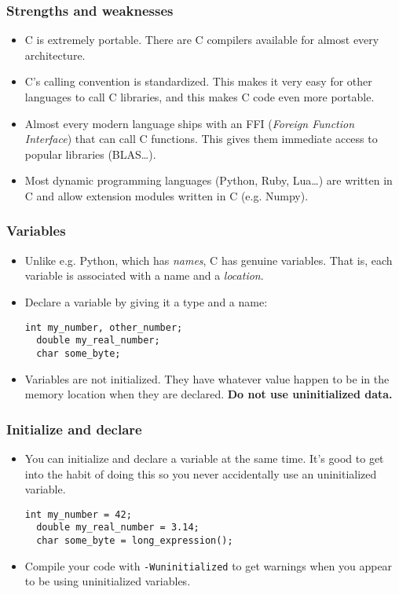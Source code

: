 \begin{frame}
  \frametitle{Strengths and weaknesses}
  \begin{itemize}
  \item C is extremely portable. There are C compilers available for almost
    every architecture.
  \item C's calling convention is standardized. This makes it very easy for
    other languages to call C libraries, and this makes C code even more
    portable.
  \item Almost every modern language ships with an FFI
    (\emph{Foreign Function Interface}) that can call C functions. This gives
    them immediate access to popular libraries (BLAS\ldots).
  \item Most dynamic programming languages (Python, Ruby, Lua\ldots) are written
    in C and allow extension modules written in C (e.g. Numpy).
  \end{itemize}
\end{frame}

\begin{frame}[fragile]
  \frametitle{Variables}
  \begin{itemize}
  \item Unlike e.g. Python, which has \emph{names}, C has genuine variables.
    That is, each variable is associated with a name and a \emph{location}.
  \item Declare a variable by giving it a type and a name:
\begin{lstlisting}[style=c]
  int my_number, other_number;
  double my_real_number;
  char some_byte;
\end{lstlisting}
  \item Variables are not initialized. They have whatever value happen to be in
    the memory location when they are declared. \textbf{Do not use uninitialized
      data.}
  \end{itemize}
\end{frame}

\begin{frame}[fragile]
  \frametitle{Initialize and declare}
  \begin{itemize}
  \item You can initialize and declare a variable at the same time. It's good to
    get into the habit of doing this so you never accidentally use an
    uninitialized variable.
\begin{lstlisting}[style=c]
  int my_number = 42;
  double my_real_number = 3.14;
  char some_byte = long_expression();
\end{lstlisting}
  \item Compile your code with \texttt{-Wuninitialized} to get warnings when you
    appear to be using uninitialized variables.
  \end{itemize}
\end{frame}

